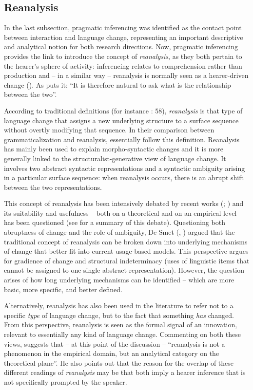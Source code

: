 \subsection{Reanalysis}
\hypertarget{Toc124860634}{}
In the last subsection, pragmatic inferencing was identified as the contact point between interaction and language change, representing an important descriptive and analytical notion for both research directions. Now, pragmatic inferencing provides the link to introduce the concept of \textit{reanalysis}, as they both pertain to the hearer’s sphere of activity: inferencing relates to comprehension rather than production and – in a similar way – reanalysis is normally seen as a hearer-driven change (\citealt{DetgesWaltereit2002}). As \citet[57]{Waltereit2018} puts it: “It is therefore natural to ask what is the relationship between the two”.

According to traditional definitions (for instance \citealt{Langacker1977}: 58), \textit{reanalysis} is that type of language change that assigns a new underlying structure to a surface sequence without overtly modifying that sequence. In their comparison between grammaticalization and reanalysis, \citet{DetgesWaltereit2002} essentially follow this definition. Reanalysis has mainly been used to explain morpho-syntactic changes and it is more generally linked to the structuralist-generative view of language change. It involves two abstract syntactic representations and a syntactic ambiguity arising in a particular surface sequence: when reanalysis occurs, there is an abrupt shift between the two representations.

This concept of reanalysis has been intensively debated by recent works (\citealt{Smet2009,Smet2014}; \citealt{Whitman2012}) and its suitability and usefulness – both on a theoretical and on an empirical level – has been questioned (see \citealt{Waltereit2018} for a summary of this debate). Questioning both abruptness of change and the role of ambiguity, De Smet (\citeyear[1748–1751]{Smet2009}, \citeyear[28–37]{Smet2014}) argued that the traditional concept of reanalysis can be broken down into underlying mechanisms of change that better fit into current usage-based models. This perspective argues for gradience of change and structural indeterminacy (uses of linguistic items that cannot be assigned to one single abstract representation). However, the question arises of how long underlying mechanisms can be identified – which are more basic, more specific, and better defined.

Alternatively, reanalysis has also been used in the literature to refer not to a specific \textit{type} of language change, but to the fact that something \textit{has} changed. From this perspective, reanalysis is seen as the formal signal of an innovation, relevant to essentially any kind of language change. Commenting on both these views, \citet[60--61]{Waltereit2018} suggests that – at this point of the discussion – “reanalysis is not a phenomenon in the empirical domain, but an analytical category on the theoretical plane”. He also points out that the reason for the overlap of these different readings of \textit{reanalysis} may be that both imply a hearer inference that is not specifically prompted by the speaker.

